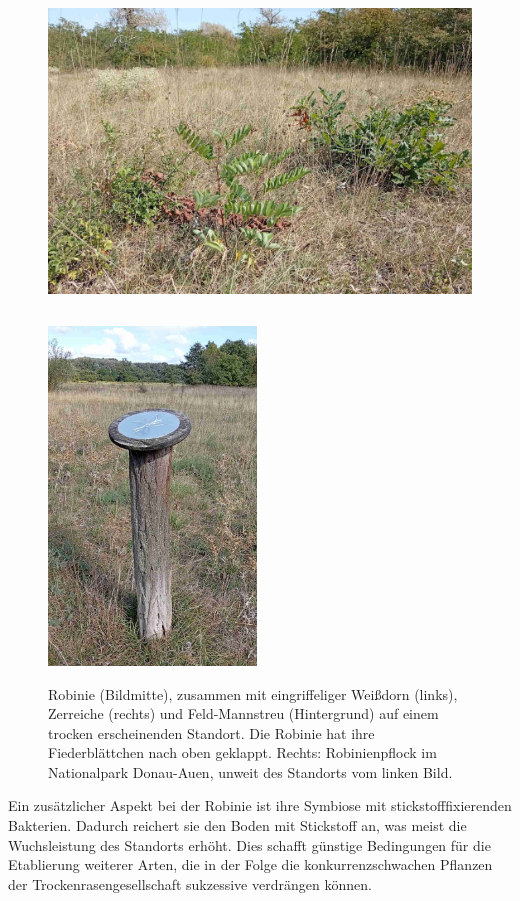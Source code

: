 \documentclass[twocolumn]{scrartcl}
\begin{document}
\begin{figure}[htbp]
  \centering
  \includegraphics[height=9cm]{./bild/feldmannstreu2}
  \includegraphics[height=9cm]{./bild/robPflockNP}
  \caption{Robinie (Bildmitte), zusammen mit eingriffeliger Weißdorn (links), Zerreiche (rechts) und Feld-Mannstreu (Hintergrund) auf einem trocken erscheinenden Standort. Die Robinie hat ihre Fiederblättchen nach oben geklappt. Rechts: Robinienpflock im Nationalpark Donau-Auen, unweit des Standorts vom linken Bild.}
  \label{fig:feldmannstreu}
\end{figure}

Ein zusätzlicher Aspekt bei der Robinie ist ihre Symbiose mit
stickstofffixierenden Bakterien. Dadurch reichert sie den Boden mit
Stickstoff an, was meist die Wuchsleistung des Standorts erhöht. Dies
schafft günstige Bedingungen für die Etablierung weiterer Arten, die
in der Folge die konkurrenzschwachen Pflanzen der
Trockenrasengesellschaft sukzessive verdrängen können.
\end{document}
